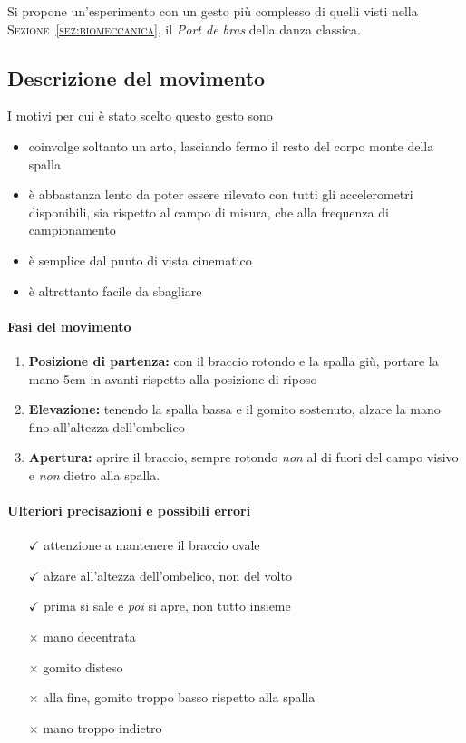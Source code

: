 Si propone un'esperimento con un gesto più complesso
di quelli visti nella \textsc{Sezione~\ref{sez:biomeccanica}},
il \textit{Port de bras} della danza classica.

\subsection{Descrizione del movimento} \label{ssez:descrizionedelmovimento}
I motivi per cui è stato scelto questo gesto sono  
\begin{itemize}
	\item coinvolge soltanto un arto, lasciando fermo il resto del corpo monte della spalla
    \item è abbastanza lento da poter essere rilevato con tutti gli accelerometri disponibili, sia rispetto al campo di misura, che alla frequenza di campionamento
    \item è semplice dal punto di vista cinematico
    \item è altrettanto facile da sbagliare
\end{itemize}

\paragraph{Fasi del movimento}
\begin{enumerate}
	\item \textbf{Posizione di partenza:} con il braccio rotondo e la spalla giù, portare la mano 5cm in avanti rispetto alla posizione di riposo
    \item \textbf{Elevazione:} tenendo la spalla bassa e il gomito sostenuto, alzare la mano fino all'altezza dell'ombelico
    \item \textbf{Apertura:} aprire il braccio, sempre rotondo \emph{non} al di fuori del campo visivo e \emph{non} dietro alla spalla.
\end{enumerate}

\paragraph{Ulteriori precisazioni e possibili errori}
\begin{itemize}
    \item [$\checkmark$] attenzione a mantenere il braccio ovale
    \item [$\checkmark$] alzare all'altezza dell'ombelico, non del volto
    \item [$\checkmark$] prima si sale e \emph{poi} si apre, non tutto insieme
	\item[$\times$] mano decentrata
   	\item[$\times$] gomito disteso
	\item[$\times$] alla fine, gomito troppo basso rispetto alla spalla
   	\item[$\times$] mano troppo indietro
\end{itemize}







